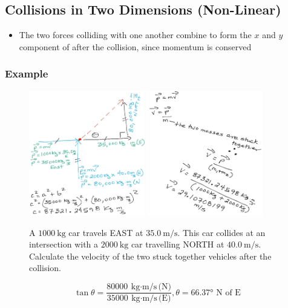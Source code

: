 \documentclass[a4paper,12pt]{article}
\begin{document}
\subsection{Collisions in Two Dimensions (Non-Linear)}
\begin{itemize}
    \item{The two forces colliding with one another combine to form the $x$ and $y$ component of after the collision, since momentum is conserved}
\end{itemize}
\subsubsection{Example}
\begin{figure}[H]
    \centering
    \caption{A $\SI{1000}{\kg}$ car travels EAST at $\SI{35.0}{\m\per\s}$. This car collides at an intersection with a $\SI{2000}{\kg}$ car travelling NORTH at $\SI{40.0}{\m\per\s}$. Calculate the velocity of the two stuck together vehicles after the collision.}
    \includegraphics[width=0.45\textwidth]{q-2dcol}
    \includegraphics[width=0.45\textwidth]{q-2dcol-b}
\end{figure}
$$\tan{\theta} = \frac{ \SI{80000}{\kg\cdot\m\per\s}\textrm{(N)} }{ \SI{35000}{\kg\cdot\m\per\s}\textrm{(E)} }, \theta = \ang{66.37} \textrm{ N of E}$$
\end{document}
